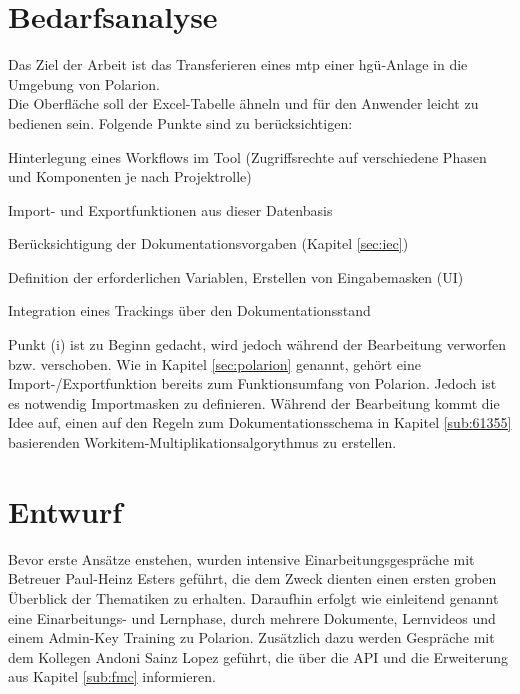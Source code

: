\chapter{Bedarfsanalyse}
\label{cha:bedarf}
\thispagestyle{scrheadings}
\pagestyle{scrheadings}
Das Ziel der Arbeit ist das Transferieren eines \ac{mtp} einer \ac{hgü}-Anlage in die Umgebung von Polarion.\\
Die Oberfläche soll der Excel-Tabelle ähneln und für den Anwender leicht zu bedienen sein.
Folgende Punkte sind zu berücksichtigen:
\begin{compactenum}[(i)]
 \item Hinterlegung eines Workflows im Tool (Zugriffsrechte auf verschiedene Phasen und Komponenten je nach Projektrolle) 
 \item Import- und Exportfunktionen aus dieser Datenbasis 
 \item Berücksichtigung der Dokumentationsvorgaben (Kapitel \ref{sec:iec})
 \item Definition der erforderlichen Variablen, Erstellen von Eingabemasken (UI)
 \item Integration eines Trackings über den Dokumentationsstand
 \end{compactenum}
Punkt (i) ist zu Beginn gedacht, wird jedoch während der Bearbeitung verworfen bzw. verschoben.
Wie in Kapitel \ref{sec:polarion} genannt, gehört eine Import-/Exportfunktion bereits zum Funktionsumfang von Polarion. Jedoch ist es notwendig Importmasken zu definieren.
Während der Bearbeitung kommt die Idee auf, einen auf den Regeln zum Dokumentationsschema in Kapitel \ref{sub:61355} basierenden Workitem-Multiplikationsalgorythmus zu erstellen.
\chapter{Entwurf}
\label{cha:ent}
\thispagestyle{scrheadings}
Bevor erste Ansätze enstehen, wurden intensive Einarbeitungsgespräche mit Betreuer Paul-Heinz Esters geführt, die dem Zweck dienten einen ersten groben Überblick der Thematiken zu erhalten. Daraufhin erfolgt wie einleitend genannt eine Einarbeitungs-  und Lernphase, durch mehrere Dokumente, Lernvideos und einem Admin-Key Training zu Polarion. Zusätzlich dazu werden Gespräche mit dem Kollegen Andoni Sainz Lopez geführt, die über die API und die Erweiterung aus Kapitel \ref{sub:fmc} informieren.\\
